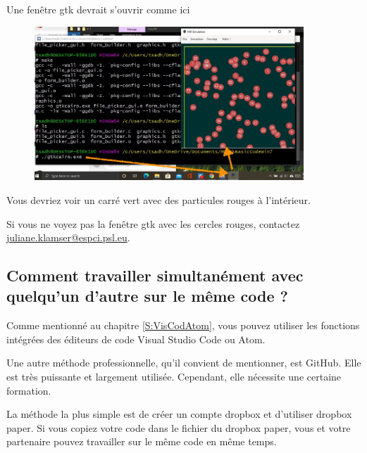 \documentclass{article}
\begin{document}
Une fenêtre gtk devrait s'ouvrir comme ici
\begin{figure}[H]
\center
\includegraphics[width=0.9\textwidth]{Plots/MD_4XMing.jpeg}
\end{figure}
Vous devriez voir un carré vert avec des particules rouges à l'intérieur.

Si vous ne voyez pas la fenêtre gtk avec les cercles rouges, contactez \href{mailto:example@example.com}{juliane.klamser@espci.psl.eu}.
\subsection{Comment travailler simultanément avec quelqu'un d'autre sur le même code ?}
Comme mentionné au chapitre \ref{S:VisCodAtom}, vous pouvez utiliser les fonctions intégrées des éditeurs de code Visual Studio Code ou Atom. 

Une autre méthode professionnelle, qu'il convient de mentionner, est GitHub. Elle est très puissante et largement utilisée. Cependant, elle nécessite une certaine formation.

La méthode la plus simple est de créer un compte dropbox et d'utiliser dropbox paper. Si vous copiez votre code dans le fichier du dropbox paper, vous et votre partenaire pouvez travailler sur le même code en même temps.




%  
\end{document}

